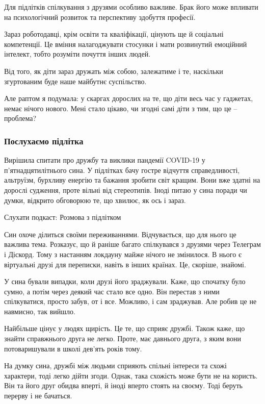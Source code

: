 Для підлітків спілкування з друзями особливо важливе. Брак його може впливати
на психологічний розвиток та перспективу здобуття професії.

Зараз роботодавці, крім освіти та кваліфікації, цінують ще й соціальні
компетенції. Це вміння налагоджувати стосунки і мати розвинутий емоційний
інтелект, тобто розуміти почуття інших людей.

Від того, як діти зараз дружать між собою, залежатиме і те, наскільки
згуртованим буде наше майбутнє суспільство.

Але раптом я подумала: у скаргах дорослих на те, що діти весь час у гаджетах,
немає нічого нового. Мені стало цікаво, чи згодні самі діти з тим, що це –
проблема?

\subsubsection{Послухаємо підлітка}

Вирішила спитати про дружбу та виклики пандемії COVID-19 у п’ятнадцятилітнього
сина. У підлітках бачу гостре відчуття справедливості, альтруїзм, бурхливу
енергію та бажання зробити світ кращим. Вони вже здатні на дорослі судження,
проте вільні від стереотипів. Іноді питаю у сина поради чи думки, відкрито
обговорюю те, що хвилює, як ось і зараз.

Слухати подкаст: Розмова з підлітком

Син охоче ділиться своїми переживаннями. Відчувається, що для нього це важлива
тема. Розказує, що й раніше багато спілкувався з друзями через Телеграм і
Діскорд. Тому з настанням локдауну майже нічого не змінилося. В нього є
віртуальні друзі для переписки, навіть в інших країнах. Це, скоріше, знайомі.

У сина бували випадки, коли друзі його зраджували. Каже, що спочатку було
сумно, а потім через деякий час стало все одно. Він перестав з ними
спілкуватися, просто забув, от і все. Можливо, і сам зраджував. Але робив це не
навмисно, так вийшло.

Найбільше цінує у людях щирість. Це те, що сприяє дружбі. Також каже, що знайти
справжнього друга не легко. Проте, має давнього друга, з яким вони
потоваришували в школі дев’ять років тому.

На думку сина, дружбі між людьми сприяють спільні інтереси та схожі характери,
тоді легко дійти згоди. Однак, така схожість може бути не на користь. Він та
його друг обидва вперті, й іноді вперто стоять на своєму. Тоді беруть перерву і
не бачаться.


